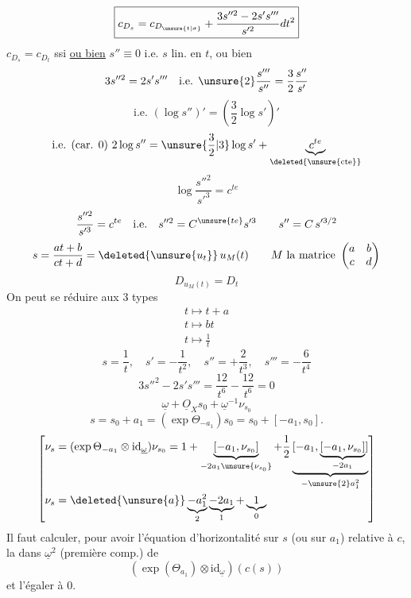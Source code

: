 \[
\boxed{c_{D_s}=c_{D_{\unsure{t|\sigma}}}+\frac{3s''^2-2s's'''}{s'^2}dt^2}
\]
 $c_{D_s}=c_{D_t}$ ssi \uline{ou bien} $s''\equiv0$ i.e. $s$ lin. en $t$, ou bien
\[
3s''^2=2s's'''\quad\text{i.e. }\unsure{2}\frac{s'''}{s''}=\frac32\frac{s''}{s'}
\]
\[
\text{i.e. }(\log s'')'=\left(\frac32\log s'\right)'
\]
\[
\text{i.e. (car. 0) }2\log s''=\unsure{\frac32|3}\log s'+\underbrace{c^{te}}_{\deleted{\unsure{\mathrm{cte}}}}
\]
\[
\log\frac{s''^2}{s'^3}=c^{te}
\]
\[
\frac{s''^2}{s'^3}=c^{te}\quad\text{i.e.}\quad s''^2=C^{\unsure{te}}s'^3
\qquad s''=C\,s'^{3/2}
\]
\[
s=\frac{at+b}{ct+d}=\deleted{\unsure{u_t}}\,u_M(t)\qquad
M\text{ la matrice }\begin{pmatrix}a&b\\c&d\end{pmatrix}
\]
\[
D_{u_M(t)}=D_t
\]
On peut se réduire aux 3 types 
\[
\begin{gathered}
t\longmapsto t+a\\
t\longmapsto bt\\
t\longmapsto\frac1t
\end{gathered}
\]
\[
s=\frac1t,\quad s'=-\frac1{t^2},\quad s''=+\frac2{t^3},\quad s'''=-\frac6{t^4}
\]
\[
3s''^2-2s's'''=\frac{12}{t^6}-\frac{12}{t^6}=0
\]
\[
\underline\omega+\underline O_Xs_0+\underline\omega^{-1}\nu_{s_0}
\]
\[
s=s_0+a_1=(\exp\Theta_{-a_1})s_0=s_0+[-a_1,s_0].
\]
\[
\left[\begin{aligned}
\nu_s&=(\exp\Theta_{-a_1}\otimes\mathrm{id}_{\underline\omega})\nu_{s_0}
=1+\underbrace{[-a_1,\nu_{s_0}]}_{-2a_1\unsure{\nu_{s_0}}}
+\frac12\underbrace{[-a_1,\underbrace{[-a_1,\nu_{s_0}]}_{-2a_1}]}_{-\unsure{2}a_1^2}\\
\nu_s&=\deleted{\unsure{a}}\underbrace{-a_1^2}_{2}\underbrace{-2a_1}_{1}+\underbrace{1}_{0}
\end{aligned}\right]
\]
Il faut calculer, pour avoir l'équation d'horizontalité sur $s$ (ou sur $a_1$) relative à $c$, la  dans $\underline\omega^2$ (première comp.) de
\[
(\exp(\Theta_{a_1})\otimes\mathrm{id}_{\underline\omega})(c(s))
\]
et l'égaler à 0.

